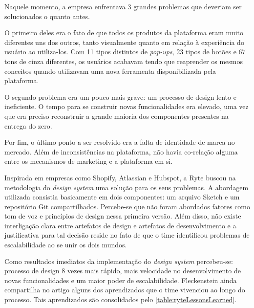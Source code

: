 Naquele momento, a empresa enfrentava 3 grandes problemas que deveriam ser solucionados o quanto antes.

O primeiro deles era o fato de que todos os produtos da plataforma eram muito diferentes uns dos outros, tanto visualmente quanto em relação à experiência do usuário ao utiliza-los. Com 11 tipos distintos de \textit{pop-ups}, 23 tipos de botões e 67 tons de cinza diferentes, os usuários acabavam tendo que reaprender os mesmos conceitos quando utilizavam uma nova ferramenta disponibilizada pela plataforma.

O segundo problema era um pouco mais grave: um processo de design lento e ineficiente. O tempo para se construir novas funcionalidades era elevado, uma vez que era preciso reconstruir a grande maioria dos componentes presentes na entrega do zero.

Por fim, o último ponto a ser resolvido era a falta de identidade de marca no mercado. Além de inconsistências na plataforma, não havia co-relação alguma entre os mecanismos de marketing e a plataforma em si.

Inspirada em empresas como Shopify, Atlassian e Hubspot, a Ryte buscou na metodologia do \textit{design system} uma solução para os seus problemas. A abordagem utilizada consistia basicamente em dois componentes: um arquivo Sketch e um repositório Git compartilhados. Percebe-se que não foram abordados fatores como tom de voz e princípios de design nessa primeira versão. Além disso, não existe interligação clara entre artefatos de design e artefatos de desenvolvimento e a justificativa para tal decisão reside no fato de que o time identificou problemas de escalabilidade ao se unir os dois mundos.

Como resultados imediatos da implementação do \textit{design system} percebeu-se: processo de design 8 vezes mais rápido, mais velocidade no desenvolvimento de novas funcionalidades e um maior poder de escalabilidade. Fleckenstein ainda compartilha no artigo alguns dos aprendizados que o time vivenciou ao longo do processo. Tais aprendizados são consolidados pelo \autoref{table:ryteLessonsLearned}.

